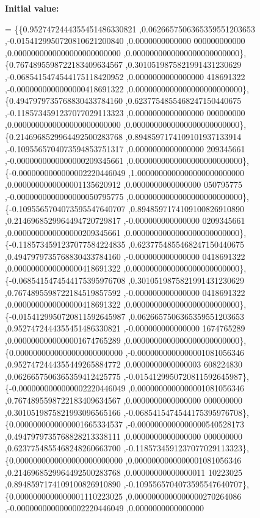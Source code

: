 {\bfseries Initial value\+:}
\begin{DoxyCode}
= \{\{0.9527472444355451486330821 ,0.0626657506365359551203653 ,-0.0154129950720810621200840 ,0.0000000000000
      000000000000 ,0.0000000000000000000000000 ,0.0000000000000000000000000\},
\{0.7674895598722183409634567 ,0.3010519875821991431230629 ,-0.0685415474544175118420952 ,0.0000000000000000
      418691322 ,-0.0000000000000000418691322 ,0.0000000000000000000000000\},
\{0.4947979735768830433784160 ,0.6237754855468247150440675 ,-0.1185734591237077029113323 ,0.0000000000000000
      000000000 ,0.0000000000000000000000000 ,0.0000000000000000000000000\},
\{0.2146968529964492500283768 ,0.8948597174109101937133914 ,-0.1095565704073594853751317 ,0.0000000000000000
      209345661 ,-0.0000000000000000209345661 ,0.0000000000000000000000000\},
\{-0.0000000000000002220446049 ,1.0000000000000000000000000 ,0.0000000000000001135620912 ,0.0000000000000000
      050795775 ,-0.0000000000000000050795775 ,0.0000000000000000000000000\},
\{-0.1095565704073595547640707 ,0.8948597174109100826910890 ,0.2146968529964494720729817 ,-0.000000000000000
      0209345661 ,0.0000000000000000209345661 ,0.0000000000000000000000000\},
\{-0.1185734591237077584224835 ,0.6237754855468247150440675 ,0.4947979735768830433784160 ,-0.000000000000000
      0418691322 ,0.0000000000000000418691322 ,0.0000000000000000000000000\},
\{-0.0685415474544175395976708 ,0.3010519875821991431230629 ,0.7674895598722184519857592 ,-0.000000000000000
      0418691322 ,0.0000000000000000418691322 ,0.0000000000000000000000000\},
\{-0.0154129950720811592645987 ,0.0626657506365359551203653 ,0.9527472444355451486330821 ,-0.000000000000000
      1674765289 ,0.0000000000000001674765289 ,0.0000000000000000000000000\},
\{0.0000000000000000000000000 ,-0.0000000000000001081056346 ,0.9527472444355449265884772 ,0.0000000000000003
      608224830 ,0.0626657506365359412425775 ,-0.0154129950720811592645987\},
\{-0.0000000000000002220446049 ,0.0000000000000001081056346 ,0.7674895598722183409634567 ,0.0000000000000000
      000000000 ,0.3010519875821993096565166 ,-0.0685415474544175395976708\},
\{0.0000000000000001665334537 ,-0.0000000000000000540528173 ,0.4947979735768828213338111 ,0.0000000000000000
      000000000 ,0.6237754855468248260663700 ,-0.1185734591237077029113323\},
\{0.0000000000000000000000000 ,0.0000000000000001081056346 ,0.2146968529964492500283768 ,0.00000000000000011
      10223025 ,0.8948597174109100826910890 ,-0.1095565704073595547640707\},
\{0.0000000000000001110223025 ,0.0000000000000000270264086 ,-0.0000000000000002220446049 ,0.0000000000000000

\end{DoxyCode}
